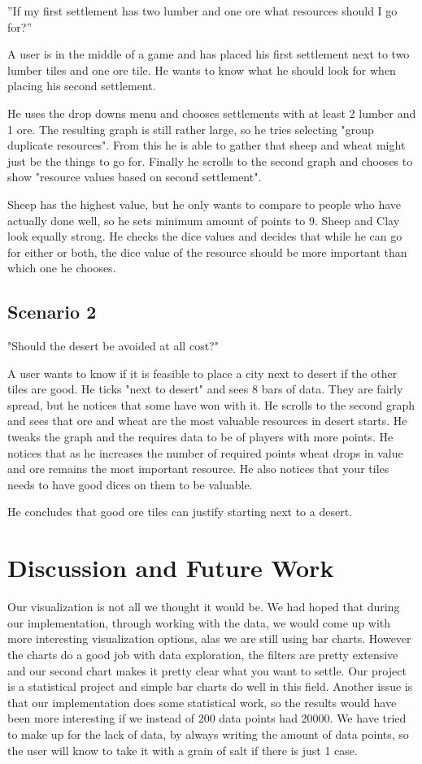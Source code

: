 \documentclass[journal]{vgtc}                %
\begin{document}
”If my first settlement has two lumber and one ore what resources should I go
for?”

A user is in the middle of a game and has placed his first settlement next to
two lumber tiles and one ore tile. He wants to know what he should look for
when placing his second settlement.

He uses the drop downs menu and chooses settlements with at least 2 lumber and
1 ore. The resulting graph is still rather large, so he tries selecting "group
duplicate resources". From this he is able to gather that sheep and wheat
might just be the things to go for. Finally he scrolls to the second graph and
chooses to show "resource values based on second settlement".

Sheep has the highest value, but he only wants to compare to people who have
actually done well, so he sets minimum amount of points to 9. Sheep and Clay
look equally strong. He checks the dice values and decides that while he
can go for either or both, the dice value of the resource should be more
important than which one he chooses.

\subsection{Scenario 2}

"Should the desert be avoided at all cost?"

A user wants to know if it is feasible to place a city next to desert if the
other tiles are good. He ticks "next to desert" and sees 8 bars of data. They
are fairly spread, but he notices that some have won with it. He scrolls to
the second graph and sees that ore and wheat are the most valuable resources
in desert starts. He tweaks the graph and the requires data to be of players
with more points. He notices that as he increases the number of required
points wheat drops in value and ore remains the most important resource. He
also notices that your tiles needs to have good dices on them to be valuable.

He concludes that good ore tiles can justify starting next to a desert.

\section{Discussion and Future Work}

Our visualization is not all we thought it would be. We had hoped that during
our implementation, through working with the data, we would come up with
more interesting visualization options, alas we are still using bar charts.
However the charts do a good job with data exploration, the filters are pretty
extensive and our second chart makes it pretty clear what you want to settle.
Our project is a statistical project and simple bar charts do well in this
field. Another issue is that our implementation does some statistical work,
so the results would have been more interesting if we instead of 200 data
points had 20000. We have tried to make up for the lack of data, by always
writing the amount of data points, so the user will know to take it with a
grain of salt if there is just 1 case.
\end{document}
